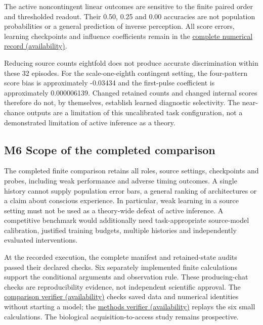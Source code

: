 \documentclass[
  american,
  11pt,
  letterpaper,
]{article}
\begin{document}
The active noncontingent linear outcomes are sensitive to the finite paired order and thresholded readout. Their 0.50, 0.25 and 0.00 accuracies are not population probabilities or a general prediction of inverse perception. All score errors, learning checkpoints and influence coefficients remain in the \href{https://github.com/v5ma/v5ma.github.io/blob/master/papers/companions/learning-to-feel-v1.0/ARTIFACT-AVAILABILITY.md\#artifact-36}{complete numerical record (availability)}.

Reducing source counts eightfold does not produce accurate discrimination within these 32 episodes. For the scale-one-eighth contingent setting, the four-pattern score bias is approximately -0.03434 and the first-pulse coefficient is approximately 0.000006139. Changed retained counts and changed internal scores therefore do not, by themselves, establish learned diagnostic selectivity. The near-chance outputs are a limitation of this uncalibrated task configuration, not a demonstrated limitation of active inference as a theory.

\subsection{M6 Scope of the completed comparison}\label{m6-scope-of-the-completed-comparison}

The completed finite comparison retains all roles, source settings, checkpoints and probes, including weak performance and adverse timing outcomes. A single history cannot supply population error bars, a general ranking of architectures or a claim about conscious experience. In particular, weak learning in a source setting must not be used as a theory-wide defeat of active inference. A competitive benchmark would additionally need task-appropriate source-model calibration, justified training budgets, multiple histories and independently evaluated interventions.

\begingroup\footnotesize
At the recorded execution, the complete manifest and retained-state audits passed their declared checks. Six separately implemented finite calculations support the conditional arguments and observation rule. These producing-chat checks are reproducibility evidence, not independent scientific approval. The \href{https://github.com/v5ma/v5ma.github.io/blob/master/papers/companions/learning-to-feel-v1.0/ARTIFACT-AVAILABILITY.md\#artifact-34}{comparison verifier (availability)} checks saved data and numerical identities without starting a model; the \href{https://github.com/v5ma/v5ma.github.io/blob/master/papers/companions/learning-to-feel-v1.0/ARTIFACT-AVAILABILITY.md\#artifact-35}{methods verifier (availability)} replays the six small calculations. The biological acquisition-to-access study remains prospective.\par\endgroup
\end{document}
